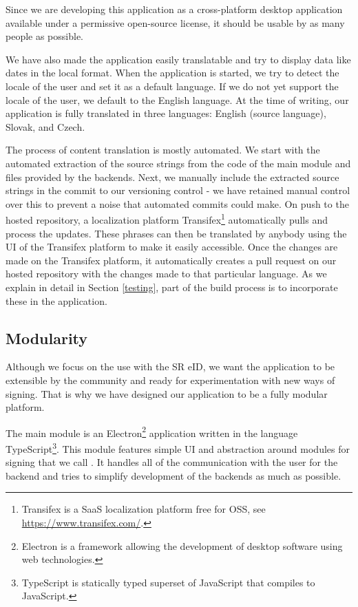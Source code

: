 \documentclass[thesismargins, english, thesislinespacing, onelinechapterstyle, upjsfrontpage]{rnthesis}
\begin{document}
Since we are developing this application as a cross-platform desktop application available under a permissive open-source license, it should be usable by as many people as possible.

We have also made the application easily translatable and try to display data like dates in the local format.
When the application is started, we try to detect the locale of the user and set it as a default language.
If we do not yet support the locale of the user, we default to the English language.
At the time of writing, our application is fully translated in three languages: English (source language), Slovak, and Czech.

The process of content translation is mostly automated.
We start with the automated extraction of the source strings from the code of the main module and files provided by the backends.
Next, we manually include the extracted source strings in the commit to our versioning control - we have retained manual control over this to prevent a noise that automated commits could make.
On push to the hosted repository, a localization platform Transifex\footnote{Transifex is a SaaS localization platform free for OSS, see \url{https://www.transifex.com/}.} automatically pulls and process the updates.
These phrases can then be translated by anybody using the UI of the Transifex platform to make it easily accessible.
Once the changes are made on the Transifex platform, it automatically creates a pull request on our hosted repository with the changes made to that particular language.
As we explain in detail in Section \ref{testing}, part of the build process is to incorporate these in the application.

\subsection{Modularity}

Although we focus on the use with the SR eID, we want the application to be extensible by the community and ready for experimentation with new ways of signing.
That is why we have designed our application to be a fully modular platform.

The main module is an Electron\footnote{Electron is a framework allowing the development of desktop software using web technologies.} application written in the language TypeScript\footnote{TypeScript is statically typed superset of JavaScript that compiles to JavaScript.}.
This module features simple UI and abstraction around modules for signing that we call .
It handles all of the communication with the user for the backend and tries to simplify development of the backends as much as possible.
\end{document}
